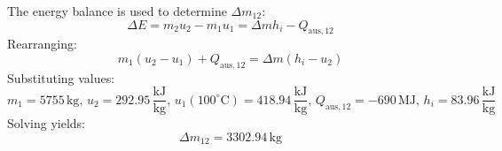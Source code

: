 The energy balance is used to determine \( \Delta m_{12} \):  
\[
\Delta E = m_2 u_2 - m_1 u_1 = \Delta m h_i - Q_{\text{aus},12}
\]  
Rearranging:  
\[
m_1 (u_2 - u_1) + Q_{\text{aus},12} = \Delta m (h_i - u_2)
\]  
Substituting values:  
\[
m_1 = 5755 \, \text{kg}, \, u_2 = 292.95 \, \frac{\text{kJ}}{\text{kg}}, \, u_1(100^\circ\text{C}) = 418.94 \, \frac{\text{kJ}}{\text{kg}}, \, Q_{\text{aus},12} = -690 \, \text{MJ}, \, h_i = 83.96 \, \frac{\text{kJ}}{\text{kg}}
\]  
Solving yields:  
\[
\Delta m_{12} = 3302.94 \, \text{kg}
\]
